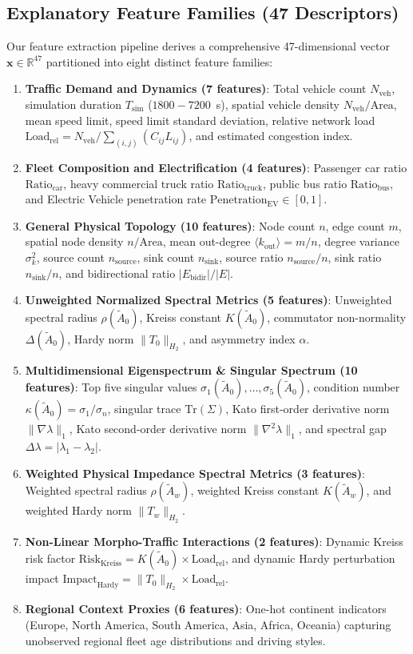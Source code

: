 \documentclass[journal]{IEEEtran}
\begin{document}
\subsection{Explanatory Feature Families (47 Descriptors)}
Our feature extraction pipeline derives a comprehensive 47-dimensional vector $\mathbf{x} \in \mathbb{R}^{47}$ partitioned into eight distinct feature families:
\begin{enumerate}
    \item \textbf{Traffic Demand and Dynamics (7 features)}: Total vehicle count $N_{\text{veh}}$, simulation duration $T_{\text{sim}}$ ($1800 - 7200$~s), spatial vehicle density $N_{\text{veh}}/\text{Area}$, mean speed limit, speed limit standard deviation, relative network load $\text{Load}_{\text{rel}} = N_{\text{veh}} / \sum_{(i,j)} (C_{ij} L_{ij})$, and estimated congestion index.
    \item \textbf{Fleet Composition and Electrification (4 features)}: Passenger car ratio $\text{Ratio}_{\text{car}}$, heavy commercial truck ratio $\text{Ratio}_{\text{truck}}$, public bus ratio $\text{Ratio}_{\text{bus}}$, and Electric Vehicle penetration rate $\text{Penetration}_{\text{EV}} \in [0, 1]$.
    \item \textbf{General Physical Topology (10 features)}: Node count $n$, edge count $m$, spatial node density $n/\text{Area}$, mean out-degree $\langle k_{\text{out}} \rangle = m/n$, degree variance $\sigma_k^2$, source count $n_{\text{source}}$, sink count $n_{\text{sink}}$, source ratio $n_{\text{source}}/n$, sink ratio $n_{\text{sink}}/n$, and bidirectional ratio $|E_{\text{bidir}}|/|E|$.
    \item \textbf{Unweighted Normalized Spectral Metrics (5 features)}: Unweighted spectral radius $\rho(\tilde{A}_0)$, Kreiss constant $K(\tilde{A}_0)$, commutator non-normality $\Delta(\tilde{A}_0)$, Hardy norm $\|T_0\|_{H_2}$, and asymmetry index $\alpha$.
    \item \textbf{Multidimensional Eigenspectrum \& Singular Spectrum (10 features)}: Top five singular values $\sigma_1(\tilde{A}_0), \dots, \sigma_5(\tilde{A}_0)$, condition number $\kappa(\tilde{A}_0) = \sigma_1/\sigma_n$, singular trace $\text{Tr}(\Sigma)$, Kato first-order derivative norm $\|\nabla \lambda\|_1$, Kato second-order derivative norm $\|\nabla^2 \lambda\|_1$, and spectral gap $\Delta\lambda = |\lambda_1 - \lambda_2|$.
    \item \textbf{Weighted Physical Impedance Spectral Metrics (3 features)}: Weighted spectral radius $\rho(\tilde{A}_w)$, weighted Kreiss constant $K(\tilde{A}_w)$, and weighted Hardy norm $\|T_w\|_{H_2}$.
    \item \textbf{Non-Linear Morpho-Traffic Interactions (2 features)}: Dynamic Kreiss risk factor $\text{Risk}_{\text{Kreiss}} = K(\tilde{A}_0) \times \text{Load}_{\text{rel}}$, and dynamic Hardy perturbation impact $\text{Impact}_{\text{Hardy}} = \|T_0\|_{H_2} \times \text{Load}_{\text{rel}}$.
    \item \textbf{Regional Context Proxies (6 features)}: One-hot continent indicators (Europe, North America, South America, Asia, Africa, Oceania) capturing unobserved regional fleet age distributions and driving styles.
\end{enumerate}
\end{document}
